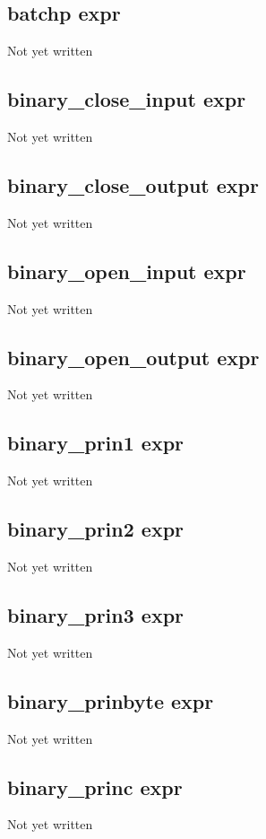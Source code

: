 \documentclass[a4paper,11pt]{article}
\begin{document}
\subsection{\ttfamily batchp expr}
Not yet written

\subsection{\ttfamily binary\_close\_input expr}
Not yet written

\subsection{\ttfamily binary\_close\_output expr}
Not yet written

\subsection{\ttfamily binary\_open\_input expr}
Not yet written

\subsection{\ttfamily binary\_open\_output expr}
Not yet written

\subsection{\ttfamily binary\_prin1 expr}
Not yet written

\subsection{\ttfamily binary\_prin2 expr}
Not yet written

\subsection{\ttfamily binary\_prin3 expr}
Not yet written

\subsection{\ttfamily binary\_prinbyte expr}
Not yet written

\subsection{\ttfamily binary\_princ expr}
Not yet written
\end{document}
